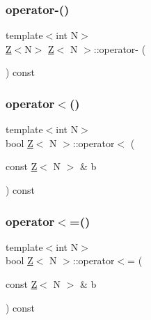 \mbox{\label{classZ_a298e4392b981d2ce937823bb26cb7421}} 
\subsubsection{\texorpdfstring{operator-\/()}{operator-()}\hspace{0.1cm}{\footnotesize\ttfamily [2/2]}}
{\footnotesize\ttfamily template$<$int N$>$ \\
\hyperlink{classZ}{Z}$<$N$>$ \hyperlink{classZ}{Z}$<$ N $>$\+::operator-\/ (\begin{DoxyParamCaption}{ }\end{DoxyParamCaption}) const\hspace{0.3cm}{\ttfamily [inline]}}

\mbox{\label{classZ_ac9464cf14368b566bd4897b7a83d0861}} 
\subsubsection{\texorpdfstring{operator$<$()}{operator<()}}
{\footnotesize\ttfamily template$<$int N$>$ \\
bool \hyperlink{classZ}{Z}$<$ N $>$\+::operator$<$ (\begin{DoxyParamCaption}\item[{const \hyperlink{classZ}{Z}$<$ N $>$ \&}]{b }\end{DoxyParamCaption}) const\hspace{0.3cm}{\ttfamily [inline]}}

\mbox{\label{classZ_a52b5a9afa8054c108b4967dfe2930642}} 
\subsubsection{\texorpdfstring{operator$<$=()}{operator<=()}}
{\footnotesize\ttfamily template$<$int N$>$ \\
bool \hyperlink{classZ}{Z}$<$ N $>$\+::operator$<$= (\begin{DoxyParamCaption}\item[{const \hyperlink{classZ}{Z}$<$ N $>$ \&}]{b }\end{DoxyParamCaption}) const\hspace{0.3cm}{\ttfamily [inline]}}

